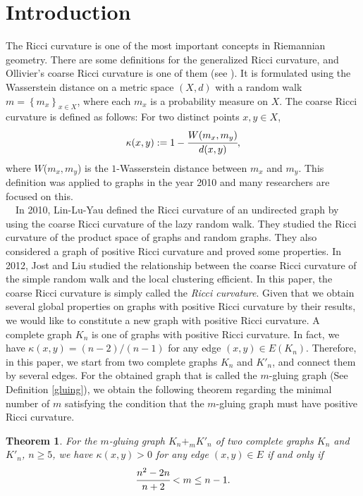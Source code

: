 \documentclass[leqno,12pt]{amsart} %
\theoremstyle{plain} %
\newtheorem{theorem}{\indent\sc Theorem}[section] %
\theoremstyle{definition} %
\begin{document}
\section{Introduction}
 The Ricci curvature is one of the most important concepts in Riemannian geometry. There are some definitions for the generalized Ricci curvature, and Ollivier's coarse Ricci curvature is one of them (see \cite{Ol1}). It is formulated using the Wasserstein distance on a metric space $(X, d)$ with a random walk $m=\left\{m_{x} \right\}_{x \in X}$, where each $m_{x}$ is a probability measure on $X$. The coarse Ricci curvature is defined as follows: For two distinct points $x, y \in X$, 
	\begin{eqnarray*}
	\kappa(x, y) := 1 - \cfrac{W(m_{x}, m_{y})}{d(x, y)},
	\end{eqnarray*}
  where $W$($m_{x}, m_{y}$) is the $1$-Wasserstein distance between $m_{x}$ and $m_{y}$. This definition was applied to graphs in the year 2010 and many researchers are focused on this. \\
　In 2010, Lin-Lu-Yau \cite{Yau1} defined the Ricci curvature of an undirected graph by using the coarse Ricci curvature of the lazy random walk. They studied the Ricci curvature of the product space of graphs and random graphs. They also considered a graph of positive Ricci curvature and proved some properties. In 2012, Jost and Liu \cite{Jo2} studied the relationship between the coarse Ricci curvature of the simple random walk and the local clustering efficient. In this paper, the coarse Ricci curvature is simply called the {\em Ricci curvature}. Given that we obtain several global properties on graphs with positive Ricci curvature by their results, we would like to constitute a new graph with positive Ricci curvature. A complete graph $K_n$ is one of graphs with positive Ricci curvature. In fact, we have $\kappa(x, y) = (n-2)/(n-1)$ for any edge $(x, y) \in E(K_n)$. Therefore, in this paper, we start from two complete graphs $K_n$ and $K'_n$, and connect them by several edges. For the obtained graph that is called the $m$-gluing graph (See Definition \ref{gluing}), we obtain the following theorem regarding the minimal number of $m$ satisfying the condition that the $m$-gluing graph must have positive Ricci curvature.
\begin{theorem}
\label{主結果}
For the $m$-gluing graph $K_{n} +_m K'_{n}$ of two complete graphs $K_{n}$ and $K'_{n}$, $n \geq 5$, we have $\kappa(x, y) > 0$ for any edge $(x, y) \in E$ if and only if 
\begin{eqnarray*}
\cfrac{n^{2} - 2n}{n + 2} < m \leq n - 1.
\end{eqnarray*}
\end{theorem}
\end{document}
